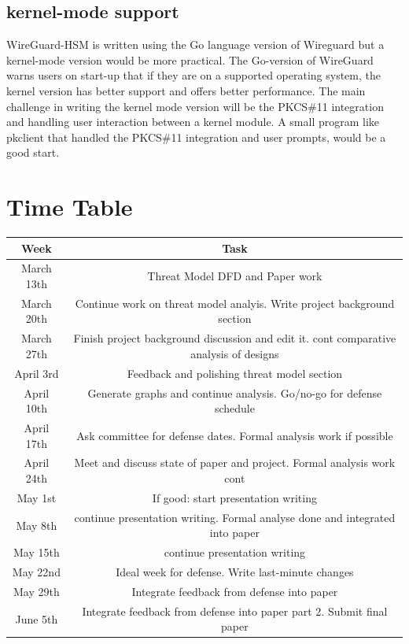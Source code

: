 \documentclass [11pt, proquest] {uwthesis}[2020/02/24]
\begin{document}
\subsection{kernel-mode support}
WireGuard-HSM is written using the Go language version of Wireguard but a kernel-mode version would be more practical. The Go-version of WireGuard warns users on start-up that if they are on a supported operating system, the kernel version has better support and offers better performance. The main challenge in writing the kernel mode version will be the PKCS\#11 integration and handling user interaction between a kernel module. A small program like pkclient that handled the PKCS\#11 integration and user prompts, would be a good start. 

\section {Time Table}
\begin{center}
\begin{tabular}{ |c|c| } 
 \hline
Week & Task \\
 \hline
March 13th & Threat Model DFD and Paper work \\ 
  \hline
March 20th & Continue work on threat model analyis. Write project background section \\ 
  \hline
March 27th & Finish project background discussion and edit it. 
cont comparative analysis of designs   \\  
 \hline
April 3rd & Feedback and polishing threat model section  \\  
 \hline
April 10th & Generate graphs and continue analysis. Go/no-go for defense schedule  \\  
 \hline
April 17th & Ask committee for defense dates. Formal analysis work if possible \\  
 \hline
April 24th & Meet and discuss state of paper and project. Formal analysis work cont  \\  
 \hline
May 1st  & If good: start presentation writing  \\  
 \hline
May 8th  & continue presentation writing. Formal analyse done and integrated into paper  \\  
 \hline
May 15th  & continue presentation writing   \\  
 \hline
May 22nd  & Ideal week for defense. Write last-minute changes  \\  
 \hline
May 29th  & Integrate feedback from defense into paper  \\  
 \hline
June 5th  & Integrate feedback from defense into paper part 2. 
Submit final paper \\  
 \hline
 
\end{tabular}
\end{center}



\end{document}

